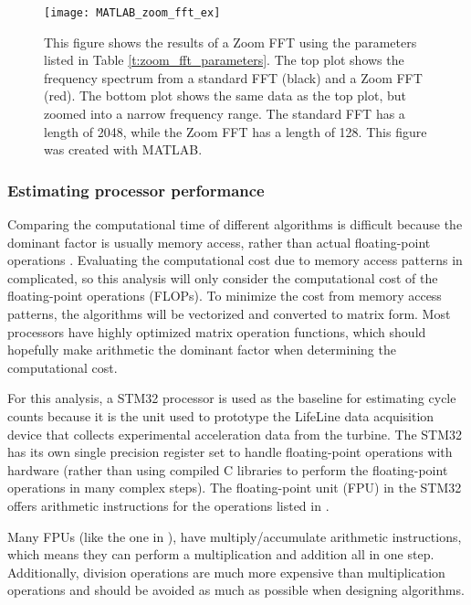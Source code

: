 \begin{figure}
	\centering
	\texttt{[image: MATLAB\_zoom\_fft\_ex]}
	\decoRule
	\caption{This figure shows the results of a Zoom FFT using the parameters listed in Table \ref{t:zoom_fft_parameters}.  The top plot shows the frequency spectrum from a standard FFT (black) and a Zoom FFT (red).  The bottom plot shows the same data as the top plot, but zoomed into a narrow frequency range. The standard FFT has a length of 2048, while the Zoom FFT has a length of 128.  This figure was created with MATLAB.}
	\label{fig:MATLAB_zoom_fft_ex}
\end{figure}

\subsubsection{Estimating processor performance}
Comparing the computational time of different algorithms is difficult because the dominant factor is usually memory access, rather than actual floating-point operations \cite{wiki_fft}.  Evaluating the computational cost due to memory access patterns in complicated, so this analysis will only consider the computational cost of the floating-point operations (FLOPs).  To minimize the cost from memory access patterns, the algorithms will be vectorized and converted to matrix form.  Most processors have highly optimized matrix operation functions, which should hopefully make arithmetic the dominant factor when determining the computational cost.

For this analysis, a STM32 processor is used as the baseline for estimating cycle counts because it is the unit used to prototype the LifeLine data acquisition device that collects experimental acceleration data from the turbine.  The STM32 has its own single precision register set to handle floating-point operations with hardware (rather than using compiled C libraries to perform the floating-point operations in many complex steps).  The floating-point unit (FPU) in the STM32 offers arithmetic instructions for the operations listed in  \cite{stm32_floating_point}.

Many FPUs (like the one in ), have multiply/accumulate arithmetic instructions, which means they can perform a multiplication and addition all in one step.  Additionally, division operations are much more expensive than multiplication operations and should be avoided as much as possible when designing algorithms.

